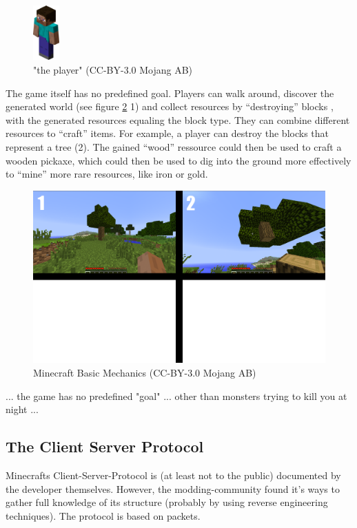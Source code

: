 \begin{figure}[h]
  \centering
    \includegraphics[width=1cm]{graphics/player}
  \caption{"the player" (CC-BY-3.0 Mojang AB) \cite{image_mob}}
  \label{mc_player}
\end{figure}


The game itself has no predefined goal. Players can walk around, discover the generated world (see figure \ref{mc_mechanics} 1) and collect resources by ``destroying'' blocks , with the generated resources equaling the block type. They can combine different resources to ``craft'' items. For example, a player can destroy the blocks that represent a tree (2). The gained ``wood'' ressource could then be used to craft a wooden pickaxe, which could then be used to dig into the ground more effectively to ``mine'' more rare resources, like iron or gold.

\begin{figure}[h]
  \centering
    \includegraphics[width=15cm]{graphics/minecraft_mechanics}
  \caption{Minecraft Basic Mechanics  (CC-BY-3.0 Mojang AB) \cite{image_mob}} %
  \label{mc_mechanics}
\end{figure}


... the game has no predefined "goal" ... other than monsters trying to kill you at night ...

        \subsection{The Client Server Protocol}
Minecrafts Client-Server-Protocol is (at least not to the public) documented by the developer themselves. However, the modding-community found it's ways to gather full knowledge of its structure (probably by using reverse engineering techniques). The protocol is based on packets. 

